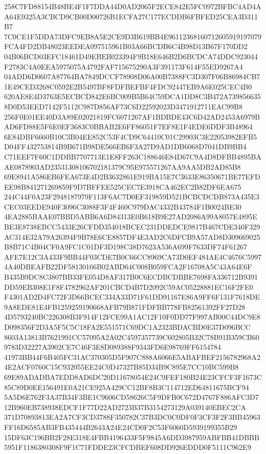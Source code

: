 \documentclass[UTF8,fontset=fandol,zihao=-4,a4paper]{ctexart}
\begin{document}
{{258C7FD88154B48BE4F1F7DDA44D0AD2065F2ECE842E5FC0972BFBC4AD4AA64E9325A3CBCD9CB00D00726B1ECFA27C177ECDDB6FBFED25CEA3D311B7
7C0CE1F5DDA73DFC9EB8A5E2CE9D3B619BB4E96112368160712605919197079FCA4FD2DB48023EEDEA097515961B03A66BCDB6C4B98D13B67F170DD2
04B06BCD03EFC18461D49EBEB023394F9B18E646B2D6BCDCA74DDC923044F2783C4A0EEA5975075A4792FAF715675290A3F391173F614F55ED9267A4
04ADD6D0607A87764BA7849DCCF78908D06A00B7388FC3D307F06B86984CB71E49CED3268C0592E2B5497BF8FDFBEFBF4FDC92447EB9A6E025CEC4B0
620AE8E4D3763E5ECBCD842E6BC009B5B64C59DCA1DD8C3B472A7398566358D0D53EED7142F5112C987D856AF73C6D22592023D3471912711EAC99B8
256F0E01EE40D3A89E02021819FC6071267AF1BDBDE43C6D42AD2453A6979BAD6FD88E5F6E0EF3683C0BBAB2E6FF86051F7EF8E1F4EDE6DDF3B48964
6E84DBF6660B10C3B04EE852C53F4CD9C64410C01C29903C3E22053982EFB5D04FF432753814B9B671B98DE566EB6F3A27D9AD1DB6068D7041DB9BB4
C71EEF7F60C1DDBB7707713E1E8FF263C188646E84D67C9A4D8DFBB4895BAAE0878903AD23531308106702181379C95E975571267AA9AA5DB2AD85B8
69E8941A586EB6FEA673E4D2B3632861E919BA15E7C3633E86350671BE77EFDEE98B841271269859F9D7BFFEE525CEC7E3918CA462EC2B82DF6EA675
244C44F0A23F2948187979F113F6AC7D0EF319859D521BCBCDCDB873A435E3CEC03EEDE940F3096C3088F3F4F460C979DAC4332B43784F1B0024BE30
4EA2885BAAE07BBD5ABB6A6D84313E0B618B9E27AD2086A99A8057E4895EBE3E8738EBCC5433E26CFDD354018BCEC231DDEDCE9817B467CDE340F329
AC314E32A79A26394F9B78E6CE8857DF4E3AD2C6DFCB9A57AD8D309669025B8B71C4B04CF0A9FC1C01DF3D198C38D7623A536A699F7633DF74F61267
AFE7E12C3A433F9BB44F03CDE7B0C66CC8969CA73D0EF484AE4C4676C59974A40DBEAFB22DF58130166B02ABD64C008B059FCA2F16708A5C43A64E6F
B435B9DC8C3807BB33FE054D8AF317B0C6ECDBCDBBE7698FA336712B9391DD59EB308E1F8F4782962AF201CBCD4B7D2092C59AC05228881EC16F2FE0
F4301AD2D4FC72F3D66BCEC334A33D71F61DD91167E86A9FF6F131F7618DE9A8EDE81E4FB1259259190668AFB79B871FDFBB778FB82561392FF27D28
4D5793240BC226308B3F914F12FCE99A1AC12F10F0DD77F997AB00C44DC9E8D098356F2D3A5F5C5C18FA2E551571C69DC1A2323BDACBD0E37D096BCC
8603A13813B7621991CC57095A2A02C4597357739C602805B32C78B91B359CB609783D32227A3902CE7C46F3E8D089388F9343FD6E98769FF6154784
41973BB44F6B405FC31AC370305D5F907C888A6066E5ABAFBEF2156782968A24E2ACF0760C15C932055EE24C0D47327B85D34B9C895E7CC10BC599B8
69E89ADADBA7EDD8AD6DC20D11678054E24C9FEF180B24E23CFCF3F1673C85C89D0EE156491E0A21CE925A429CC12BF8B3C114712ED64811675BCF94
5A5D6E762F3A37B34F3BE1C9606CD58626C5F9DFB0C672D4767F886AFC3D712B960EB738938EDCF1F77D22AD2723B37B3154273129A039140EBEC2CA
371D70893813EA2A7CF3CD3788F350782C37B3DC0C0DF0F3CF3F2F3BB45963FF16D6585AB3FB435444B2643A24E24CD0F2C53F6060D5939199355B29
15DF63C196BB2F28E318E4FBB4196433F5F9845A6DD3987959ABFBB41DBBB5951F1186380308F9F1C71FDDE23CFCDBEF608DD926EDDD0F5111C962E9
}}
\end{document}
